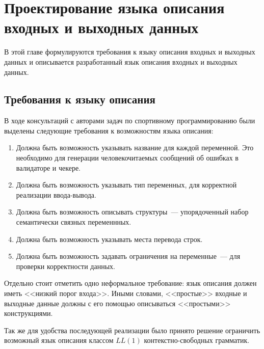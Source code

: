 \documentclass[times,specification,annotation]{style/itmo-student-thesis/itmo-student-thesis}
\begin{document}


\chapter{Проектирование языка описания входных и выходных данных}

В этой главе формулируются требования к языку описания входных и выходных данных и описывается разработанный язык описания входных и выходных данных.

\section{Требования к языку описания}

В ходе консультаций с авторами задач по спортивному программированию были выделены следующие требования к возможностям языка описания:

\begin{enumerate}
    \item Должна быть возможность указывать название для каждой переменной. Это необходимо для генерации человекочитаемых сообщений об ошибках в валидаторе и чекере.
    \item Должна быть возможность указывать тип переменных, для корректной реализации ввода-вывода.
    \item Должна быть возможность описывать структуры~--- упорядоченный набор семантически связных переменнных.
    \item Должна быть возможность указывать места перевода строк.
    \item Должна быть возможность задавать ограничения на переменные~--- для проверки корректности данных.
\end{enumerate}

Отдельно стоит отметить одно неформальное требование: язык описания должен иметь <<низкий порог входа>>. Иными словами, <<простые>> входные и выходные данные должны с его помощью описываться <<простыми>> конструкциями.

Так же для удобства последующей реализации было принято решение ограничить возможный язык описания классом $LL(1)$ контекстно-свободных грамматик.
\end{document}
